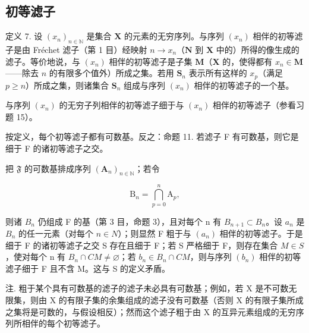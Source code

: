 \subsection{初等滤子}

定义 7. 设 \((x_{n})_{n\in \mathbb{N}}\) 是集合 \(\mathbf{X}\) 的元素的无穷序列。与序列 \((x_{n})\) 相伴的初等滤子是由 Fréchet 滤子（第 1 目）经映射 \(n\to x_n\)（\(\mathbf{N}\) 到 \(\mathbf{X}\) 中的）所得的像生成的滤子。等价地说，与 \((x_{n})\) 相伴的初等滤子是子集 \(\mathbf{M}\)（\(\mathbf{X}\) 的，使得都有 \(x_{n}\in \mathbf{M}\)——除去 \(n\) 的有限多个值外）所成之集。若用 \(\mathbf{S}_n\) 表示所有这样的 \(x_{p}\)（满足 \(p\geqslant n\)）所成之集，则诸集合 \(\mathbf{S}_n\) 组成与序列 \((x_{n})\) 相伴的初等滤子的一个基。

与序列 \((x_{n})\) 的无穷子列相伴的初等滤子细于与 \((x_{n})\) 相伴的初等滤子（参看习题 15）。

按定义，每个初等滤子都有可数基。反之：命题 11. 若滤子 F 有可数基，则它是细于 F 的诸初等滤子之交。

把 \(\mathfrak{F}\) 的可数基排成序列 \((\mathbf{A}_n)_{n\in \mathbb{N}}\)；若令

\[
\mathrm{B} _ {n} = \bigcap_ {p = 0} ^ {n} \mathrm{A} _ {p},
\]

则诸 \(B_{n}\) 仍组成 F 的基（第 3 目，命题 3），且对每个 n 有 \(B_{n+1} \subset B_{n}\)。设 \(a_{n}\) 是 \(B_{n}\) 的任一元素（对每个 \(n \in N\)）；则显然 F 粗于与 \((a_{n})\) 相伴的初等滤子。于是细于 F 的诸初等滤子之交 S 存在且细于 F；若 S 严格细于 F，则存在集合 \(M \in S\)，使对每个 n 有 \(B_{n} \cap CM \neq \varnothing\)；若 \(b_{n} \in B_{n} \cap CM\)，则与序列 \((b_{n})\) 相伴的初等滤子细于 F 且不含 M。这与 S 的定义矛盾。

注. 粗于某个具有可数基的滤子的滤子未必具有可数基；例如，若 X 是不可数无限集，则由 X 的有限子集的余集组成的滤子没有可数基（否则 X 的有限子集所成之集将是可数的，与假设相反）；然而这个滤子粗于由 X 的互异元素组成的无穷序列所相伴的每个初等滤子。


